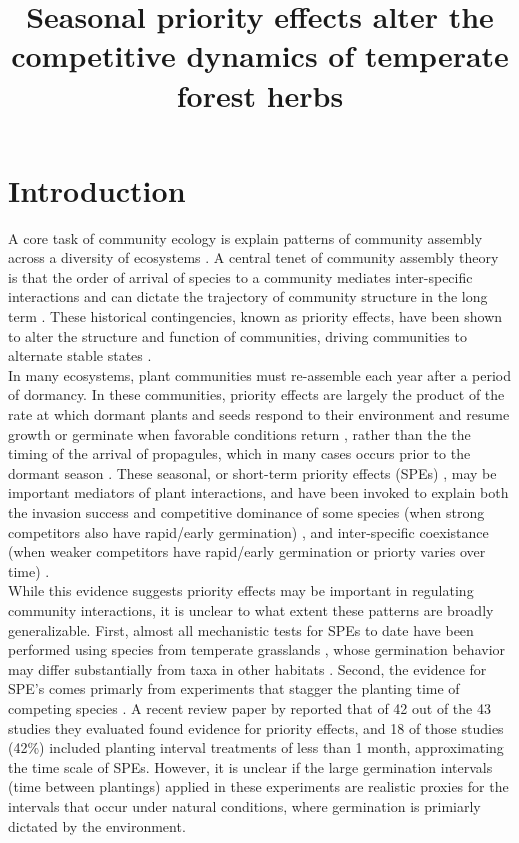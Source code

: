 \documentclass[11pt]{article}\usepackage[]{graphicx}\usepackage[]{color}
\title{Seasonal priority effects alter the competitive dynamics of temperate forest herbs }
\date{}
\author{}
\begin{document}
\maketitle
\linenumbers

\section*{Introduction}
\noindent A core task of community ecology is explain patterns of community assembly across a diversity of ecosystems \citep{Weiher:2011aa}. A central tenet of community assembly theory is that the order of arrival of species to a community mediates inter-specific interactions and can dictate the trajectory of community structure in the long term \citep{Fukami2015}. These historical contingencies, known as priority effects, have been shown to alter the structure and function of communities, driving communities to alternate stable states \citep{Fukami2011}.\\

\noindent In many ecosystems, plant communities must re-assemble each year after a period of dormancy. In these communities, priority effects are largely the product of the rate at which dormant plants and seeds respond to their environment and resume growth or germinate when favorable conditions return \citep{Rudolf:2019aa}, rather than the the timing of the arrival of propagules, which in many cases occurs prior to the dormant season \citep{Howe:1982aa,Baskin:1988aa}.  These seasonal, or short-term priority effects (SPEs) \citep{Wainwright_2011,Young:2017aa}, may be important mediators of plant interactions, and have been invoked to explain both the invasion success and competitive dominance of some species (when strong competitors also have rapid/early germination) \citep{Gioria2018}, and inter-specific coexistance (when weaker competitors have rapid/early germination or priorty varies over time) \citep{Towers:2020aa}.\\

\noident While this evidence suggests priority effects may be important in regulating community interactions, it is unclear to what extent these patterns are broadly generalizable. First, almost all mechanistic tests for SPEs to date have been performed using species from temperate grasslands \citep{Weidlich:2020aa}, whose germination behavior may differ substantially from taxa in other habitats \citep{Tudela-Isanta:2018aa}. Second, the evidence for SPE's comes primarly from experiments that stagger the planting time of competing species \citep{Young:2017aa,Letten:2018aa}. A recent review paper by \citet{Weidlich:2020aa} reported that of 42 out of the 43 studies they evaluated found evidence for priority effects, and 18 of those studies (42\%) included planting interval treatments of less than 1 month, approximating the time scale of SPEs. However, it is unclear if the large germination intervals (time between plantings) applied in these experiments are realistic proxies for the intervals that occur under natural conditions, where germination is primiarly dictated by the environment.\\
\end{document}
